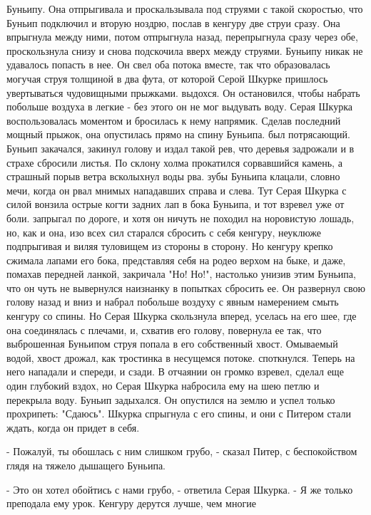Буньипу. Она отпрыгивала и проскальзывала под струями с такой 
скоростью, что Буньип подключил и вторую ноздрю, послав в кенгуру две 
струи сразу. Она впрыгнула между ними, потом отпрыгнула назад, 
перепрыгнула сразу через обе, проскользнула снизу и снова подскочила 
вверх между струями. Буньипу никак не удавалось попасть в нее. Он свел 
оба потока вместе, так что образовалась могучая струя толщиной в два 
фута, от которой Серой Шкурке пришлось увертываться чудовищными 
прыжками.
 выдохся. Он остановился, чтобы набрать побольше воздуха в 
легкие - без этого он не мог выдувать воду. Серая Шкурка 
воспользовалась моментом и бросилась к нему напрямик. Сделав последний 
мощный прыжок, она опустилась прямо на спину Буньипа.
 был потрясающий. Буньип закачался, закинул голову и издал 
такой рев, что деревья задрожали и в страхе сбросили листья. По склону 
холма прокатился сорвавшийся камень, а страшный порыв ветра всколыхнул 
воды рва.
 зубы Буньипа клацали, словно мечи, когда он рвал мнимых 
нападавших справа и слева. Тут Серая Шкурка с силой вонзила острые 
когти задних лап в бока Буньипа, и тот взревел уже от боли.
 запрыгал по дороге, и хотя он ничуть не походил на 
норовистую лошадь, но, как и она, изо всех сил старался сбросить с 
себя кенгуру, неуклюже подпрыгивая и виляя туловищем из стороны в 
сторону. Но кенгуру крепко сжимала лапами его бока, представляя себя 
на родео верхом на быке, и даже, помахав передней ланкой, закричала 
"Но! Но!", настолько унизив этим Буньипа, что он чуть не вывернулся 
наизнанку в попытках сбросить ее. Он развернул свою голову назад и 
вниз и набрал побольше воздуху с явным намерением смыть кенгуру со 
спины. Но Серая Шкурка скользнула вперед, уселась на его шее, где она 
соединялась с плечами, и, схватив его голову, повернула ее так, что 
выброшенная Буньипом струя попала в его собственный хвост. Омываемый 
водой, хвост дрожал, как тростинка в несущемся потоке.
 споткнулся. Теперь на него нападали и спереди, и сзади. В 
отчаянии он громко взревел, сделал еще один глубокий вздох, но Серая 
Шкурка набросила ему на шею петлю и перекрыла воду. Буньип задыхался. 
Он опустился на землю и успел только прохрипеть: "Сдаюсь".
 Шкурка спрыгнула с его спины, и они с Питером стали ждать, 
когда он придет в себя.
\par- Пожалуй, ты обошлась с ним слишком грубо, - сказал Питер, с 
беспокойством глядя на тяжело дышащего Буньипа.
\par- Это он хотел обойтись с нами грубо, - ответила Серая Шкурка. - Я 
же только преподала ему урок. Кенгуру дерутся лучше, чем многие 
